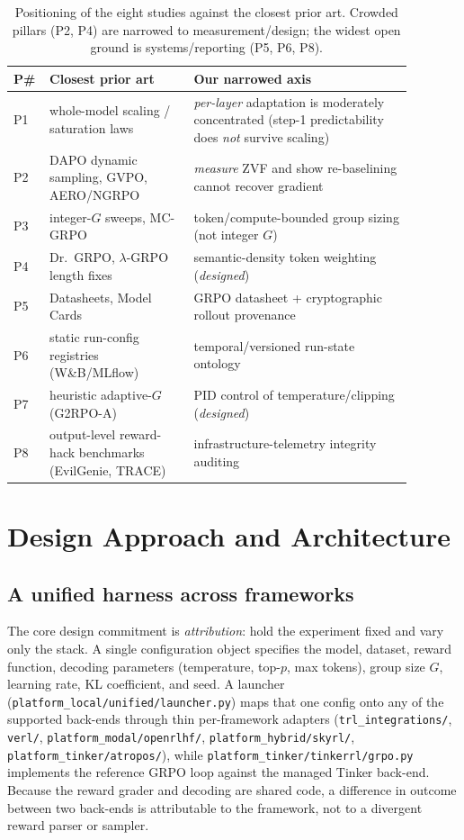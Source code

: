 \documentclass[11pt,a4paper]{article}
\begin{document}
\begin{table}[t]
\centering
\small
\setlength{\tabcolsep}{4pt}
\begin{tabular}{@{}L{0.045\linewidth}L{0.33\linewidth}L{0.50\linewidth}@{}}
\toprule
\textbf{P\#} & \textbf{Closest prior art} & \textbf{Our narrowed axis} \\
\midrule
P1 & whole-model scaling / saturation laws & \emph{per-layer} adaptation is moderately concentrated (step-1 predictability does \emph{not} survive scaling) \\
P2 & DAPO dynamic sampling, GVPO, AERO/NGRPO & \emph{measure} ZVF and show re-baselining cannot recover gradient \\
P3 & integer-$G$ sweeps, MC-GRPO & token/compute-bounded group sizing (not integer $G$) \\
P4 & Dr.\ GRPO, $\lambda$-GRPO length fixes & semantic-density token weighting (\emph{designed}) \\
P5 & Datasheets, Model Cards & GRPO datasheet + cryptographic rollout provenance \\
P6 & static run-config registries (W\&B/MLflow) & temporal/versioned run-state ontology \\
P7 & heuristic adaptive-$G$ (G2RPO-A) & PID control of temperature/clipping (\emph{designed}) \\
P8 & output-level reward-hack benchmarks (EvilGenie, TRACE) & infrastructure-telemetry integrity auditing \\
\bottomrule
\end{tabular}
\caption{Positioning of the eight studies against the closest prior art. Crowded
pillars (P2, P4) are narrowed to measurement/design; the widest open ground is
systems/reporting (P5, P6, P8).}
\label{tab:position}
\end{table}

\section{Design Approach and Architecture}
\label{sec:design}

\subsection{A unified harness across frameworks}

The core design commitment is \emph{attribution}: hold the experiment fixed and
vary only the stack. A single configuration object specifies the model, dataset,
reward function, decoding parameters (temperature, top-$p$, max tokens), group
size $G$, learning rate, KL coefficient, and seed. A launcher
(\texttt{platform\_local/unified/launcher.py}) maps that one config onto any of the supported
back-ends through thin per-framework adapters
(\texttt{trl\_integrations/}, \texttt{verl/}, \texttt{platform\_modal/openrlhf/},
\texttt{platform\_hybrid/skyrl/}, \texttt{platform\_tinker/atropos/}), while \texttt{platform\_tinker/tinkerrl/grpo.py} implements
the reference GRPO loop against the managed Tinker back-end. Because the reward
grader and decoding are shared code, a difference in outcome between two
back-ends is attributable to the framework, not to a divergent reward parser or
sampler.
\end{document}
